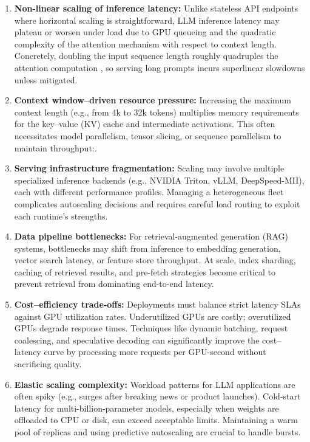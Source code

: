 \begin{enumerate}
    \item \textbf{Non-linear scaling of inference latency:} Unlike stateless API endpoints where horizontal scaling is straightforward, LLM inference latency may plateau or worsen under load due to GPU queueing and the quadratic complexity of the attention mechanism with respect to context length. Concretely, doubling the input sequence length roughly quadruples the attention computation \cite{vaswani2017_attention}, so serving long prompts incurs superlinear slowdowns unless mitigated.

    \item \textbf{Context window–driven resource pressure:} Increasing the maximum context length (e.g., from 4k to 32k tokens) multiplies memory requirements for the key–value (KV) cache and intermediate activations. This often necessitates model parallelism, tensor slicing, or sequence parallelism to maintain throughput:\cite{vaswani2017_attention,vllm_pagedattention}.

    \item \textbf{Serving infrastructure fragmentation:} Scaling may involve multiple specialized inference backends (e.g., NVIDIA Triton, vLLM, DeepSpeed-MII), each with different performance profiles. Managing a heterogeneous fleet complicates autoscaling decisions and requires careful load routing to exploit each runtime's strengths.

    \item \textbf{Data pipeline bottlenecks:} For retrieval-augmented generation (\textsc{RAG}) systems, bottlenecks may shift from inference to embedding generation, vector search latency, or feature store throughput. At scale, index sharding, caching of retrieved results, and pre-fetch strategies become critical to prevent retrieval from dominating end-to-end latency.

    \item \textbf{Cost–efficiency trade-offs:} Deployments must balance strict latency SLAs against GPU utilization rates. Underutilized GPUs are costly; overutilized GPUs degrade response times. Techniques like dynamic batching, request coalescing, and speculative decoding can significantly improve the cost–latency curve by processing more requests per GPU-second without sacrificing quality.

    \item \textbf{Elastic scaling complexity:} Workload patterns for LLM applications are often spiky (e.g., surges after breaking news or product launches). Cold-start latency for multi-billion-parameter models, especially when weights are offloaded to CPU or disk, can exceed acceptable limits. Maintaining a warm pool of replicas and using predictive autoscaling are crucial to handle bursts.


\end{enumerate}
